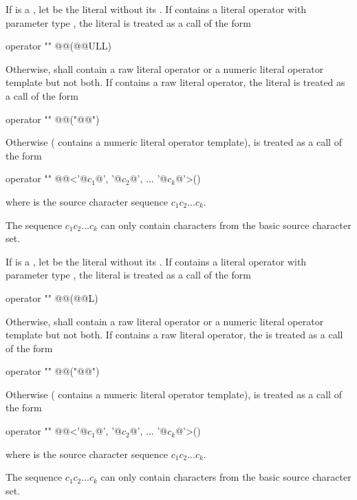 \pnum
If  is a , let  be the literal
without its . If  contains a literal operator with
parameter type , the literal  is treated as a call of
the form
\begin{codeblock}
operator "" @@(@@ULL)
\end{codeblock}
Otherwise,  shall contain a raw literal operator
or a numeric literal operator template but not both.
If  contains a raw literal operator,
the literal  is treated as a call of the form
\begin{codeblock}
operator "" @@("@@")
\end{codeblock}
Otherwise ( contains a numeric literal operator template),
 is treated as a call of the form
\begin{codeblock}
operator "" @@<'@$c_1$@', '@$c_2$@', ... '@$c_k$@'>()
\end{codeblock}
where  is the source character sequence $c_1c_2...c_k$.
\begin{note}
The sequence
$c_1c_2...c_k$ can only contain characters from the basic source character set.
\end{note}

\pnum
If  is a , let  be the
literal without its . If  contains a literal operator
with parameter type , the literal  is treated as a call of
the form
\begin{codeblock}
operator "" @@(@@L)
\end{codeblock}
Otherwise,  shall contain a raw literal operator
or a numeric literal operator template but not both.
If  contains a raw literal operator,
the   is treated as a call of the form
\begin{codeblock}
operator "" @@("@@")
\end{codeblock}
Otherwise ( contains a numeric literal operator template),
 is treated as a call of the form
\begin{codeblock}
operator "" @@<'@$c_1$@', '@$c_2$@', ... '@$c_k$@'>()
\end{codeblock}
where  is the source character sequence $c_1c_2...c_k$.
\begin{note}
The sequence
$c_1c_2...c_k$ can only contain characters from the basic source character set.
\end{note}

